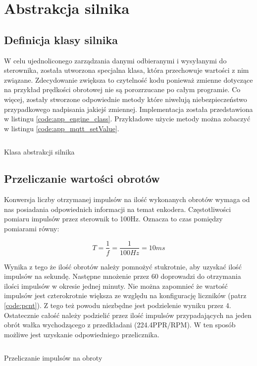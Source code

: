 \section{Abstrakcja silnika}
    \subsection{Definicja klasy silnika}
        W celu ujednoliconego zarządzania danymi odbieranymi i wysyłanymi do sterownika, została utworzona specjalna klasa, która przechowuje wartości z nim związane. Zdecydowanie zwiększa to czytelność kodu ponieważ zmienne dotyczące na przykład prędkości obrotowej nie są porozrzucane po całym programie. Co więcej, zostały stworzone odpowiednie metody które niwelują niebezpieczeństwo przypadkowego nadpisania jakiejś zmiennej. Implementacja została przedstawiona w listingu \ref{code:app_engine_class}. Przykładowe użycie metody można zobaczyć w listingu \ref{code:app_mqtt_setValue}.
        
        \begin{kod}
            \inputminted[firstline=3, lastline=23]{cpp}{app/listings/engine.hpp}
            \caption{Klasa abstrakcji silnika}
            \label{code:app_engine_class}
            \vspace{2em}
        \end{kod}    


    \subsection{Przeliczanie wartości obrotów}
        Konwersja liczby otrzymanej impulsów na ilość wykonanych obrotów wymaga od nas posiadania odpowiednich informacji na temat enkodera. Częstotliwości pomiaru impulsów przez sterownik to 100Hz. Oznacza to czas pomiędzy pomiarami równy:
        
       \begin{displaymath}
          T = \frac{1}{ f } = \frac{1}{ 100Hz } = 10ms
        \end{displaymath}
        
        Wynika z tego że ilość obrotów należy pomnożyć stukrotnie, aby uzyskać ilość impulsów na sekundę. Następne mnożenie przez 60 doprowadzi do otrzymania ilości impulsów w okresie jednej minuty. Nie można zapomnieć że wartość impulsów jest czterokrotnie większa ze względu na konfigurację liczników (patrz \ref{code:pcnt}). Z tego też powodu niezbędne jest podzielenie wyniku przez 4. Ostatecznie całość należy podzielić przez ilość impulsów przypadających na jeden obrót wałka wychodzącego z przedkładani (224.4PPR/RPM). W ten sposób możliwe jest uzyskanie odpowiedniego przelicznika.
        
        \begin{kod}
            \inputminted[firstline=27, lastline=40]{cpp}{app/listings/engine.hpp}
            \caption{Przeliczanie impulsów na obroty}
            \label{code:app_engine_rpm}
            \vspace{2em}
        \end{kod}
        
